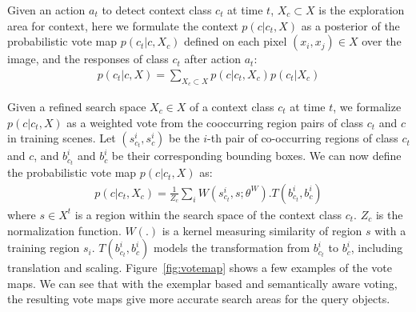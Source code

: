 Given an action $a_t$ to detect context class $c_t$ at time $t$, $X_c \subset X$ is the exploration area for context, here we formulate the context $p(c|c_t,X)$ as a posterior of the probabilistic vote map $p(c_t|c,X_c)$ defined on each pixel $(x_i,x_j)\in X$ over the image, and the responses of class $c_t$ after action $a_t$:
\begin{eqnarray}
p(c_t|c,X) = \sum_{X_c \subset X} p(c|c_t,X_c)p(c_t|X_c)
\end{eqnarray}

Given a refined search space $X_c\in X$ of a context class $c_t$ at time $t$, we formalize $p(c|c_t,X)$ as a weighted vote from the cooccurring region pairs of class $c_t$ and $c$ in training scenes. Let $(s_{c_t}^i, s_c^i)$ be the $i$-th pair of co-occurring regions of class $c_t$ and $c$, and $b_{c_t}^i$ and $b_c^i$ be their corresponding bounding boxes. We can now define the probabilistic vote map $p(c|c_t,X)$ as:
\begin{eqnarray}
\label{eq:votemap}
p(c|c_t,X_c) = \frac{1}{Z_c}\sum_i W(s_{c_t}^i,s;\theta^W).T(b_{c_t}^i,b_c^i)
\end{eqnarray}
where $s\in X^t$ is a region within the search space of the context class $c_t$. $Z_c$ is the normalization function. $W(.)$ is a kernel measuring similarity of region $s$ with a training region $s_i$. $T(b_{c_t}^i,b_c^i)$ models the transformation from $b_{c_t}^i$ to $b_c^i$, including translation and scaling. Figure~\ref{fig:votemap} shows a few examples of the vote maps. We can see that with the exemplar based and semantically aware voting, the resulting vote maps give more accurate search areas for the query objects.



